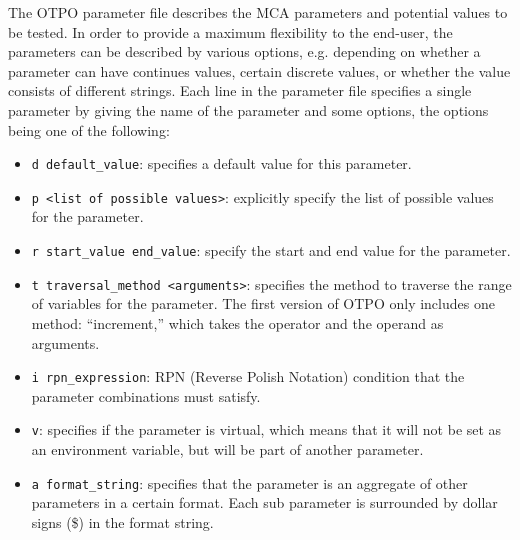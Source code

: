 The OTPO parameter file describes the MCA parameters and potential
values to be tested. In order to provide a maximum flexibility to the
end-user, the parameters can be described by various options,
e.g. depending on whether a parameter can have continues values,
certain discrete values, or whether the value consists of different
strings. Each line in the parameter file specifies a single parameter
by giving the name of the parameter and some options, the options
being one of the following:
\begin{itemize}
\item {\tt d default\_\-value}: specifies a default value for this
  parameter.
\item {\tt p <list of possible values>}: explicitly specify the list
  of possible values for the parameter.
\item {\tt r start\_\-value end\_\-value}: specify the start and end
  value for the parameter.
\item {\tt t traversal\_\-method <arguments>}: specifies the method to
  traverse the range of variables for the parameter. The first version
  of OTPO only includes one method: ``increment,'' which takes the
  operator and the operand as arguments.
\item {\tt i rpn\_\-expression}: RPN (Reverse Polish Notation)
  condition that the parameter combinations must satisfy.
\item {\tt v}: specifies if the parameter is virtual, which means that
  it will not be set as an environment variable, but will be part of
  another parameter.
\item {\tt a format\_\-string}: specifies that the parameter is an
  aggregate of other parameters in a certain format. Each sub
  parameter is surrounded by dollar signs (\$) in the format string.
\end{itemize}

